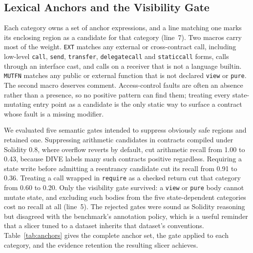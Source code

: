 \documentclass{ieeeaccess}
\begin{document}
\subsection{Lexical Anchors and the Visibility Gate}\label{subsec:anchors}
Each category owns a set of anchor expressions, and a line matching one marks its enclosing region as a candidate for that category (line~7). Two macros carry most of the weight. \texttt{EXT} matches any external or cross-contract call, including low-level \texttt{call}, \texttt{send}, \texttt{transfer}, \texttt{delegatecall} and \texttt{staticcall} forms, calls through an interface cast, and calls on a receiver that is not a language builtin. \texttt{MUTFN} matches any public or external function that is not declared \texttt{view} or \texttt{pure}. The second macro deserves comment. Access-control faults are often an absence rather than a presence, so no positive pattern can find them; treating every state-mutating entry point as a candidate is the only static way to surface a contract whose fault is a missing modifier.

We evaluated five semantic gates intended to suppress obviously safe regions and retained one. Suppressing arithmetic candidates in contracts compiled under Solidity 0.8, where overflow reverts by default, cut arithmetic recall from 1.00 to 0.43, because DIVE labels many such contracts positive regardless. Requiring a state write before admitting a reentrancy candidate cut its recall from 0.91 to 0.36. Treating a call wrapped in \texttt{require} as a checked return cut that category from 0.60 to 0.20. Only the visibility gate survived: a \texttt{view} or \texttt{pure} body cannot mutate state, and excluding such bodies from the five state-dependent categories cost no recall at all (line~5). The rejected gates were sound as Solidity reasoning but disagreed with the benchmark's annotation policy, which is a useful reminder that a slicer tuned to a dataset inherits that dataset's conventions. Table~\ref{tab:anchors} gives the complete anchor set, the gate applied to each category, and the evidence retention the resulting slicer achieves.
\end{document}
